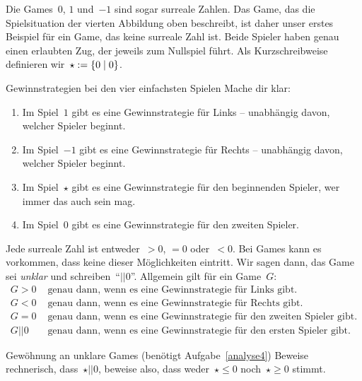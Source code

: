 \documentclass{zirkelblatt}
\newcommand{\fuzzy}{\mathrel{||}}
\begin{document}
Die Games~$0$, $1$ und~$-1$ sind sogar surreale Zahlen. Das Game, das die
Spielsituation der vierten Abbildung oben beschreibt, ist daher unser erstes
Beispiel für ein Game, das keine surreale Zahl ist. Beide Spieler haben genau
einen erlaubten Zug, der jeweils zum Nullspiel führt. Als Kurzschreibweise
definieren wir~$\star := \{ 0 \mathrel{|} 0 \}$.

\begin{aufgabe}{Gewinnstrategien bei den vier einfachsten Spielen}
\label{analyse4}
Mache dir klar:
\begin{enumerate}
\item Im Spiel~$1$ gibt es eine Gewinnstrategie für Links -- unabhängig davon,
welcher Spieler beginnt.
\item Im Spiel~$-1$ gibt es eine Gewinnstrategie für Rechts -- unabhängig davon,
welcher Spieler beginnt.
\item Im Spiel~$\star$ gibt es eine Gewinnstrategie für den beginnenden Spieler,
wer immer das auch sein mag.
\item Im Spiel~$0$ gibt es eine Gewinnstrategie für den zweiten Spieler.
\end{enumerate}
\end{aufgabe}

Jede surreale Zahl ist entweder~$> 0$, $= 0$ oder~$< 0$. Bei Games kann es
vorkommen, dass keine dieser Möglichkeiten eintritt. Wir sagen dann, das Game
sei \emph{unklar} und schreiben~"`$\fuzzy 0$"'. Allgemein gilt für ein Game~$G$:
\begin{align*}
  G > 0 &\text{ genau dann, wenn es eine Gewinnstrategie für Links gibt.} \\
  G < 0 &\text{ genau dann, wenn es eine Gewinnstrategie für Rechts gibt.} \\
  G = 0 &\text{ genau dann, wenn es eine Gewinnstrategie für den zweiten Spieler gibt.} \\
  G \fuzzy 0 &\text{ genau dann, wenn es eine Gewinnstrategie für den ersten Spieler gibt.}
\end{align*}

\begin{aufgabe}{Gewöhnung an unklare Games (benötigt Aufgabe~\ref{analyse4})}
Beweise rechnerisch, dass~$\star \fuzzy 0$, beweise also, dass weder~$\star
\leq 0$ noch~$\star \geq 0$ stimmt.
\end{aufgabe}
\end{document}
